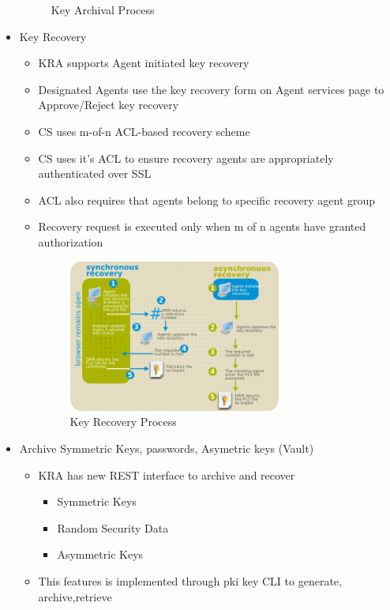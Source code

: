 \documentclass[12pt]{report}
\begin{document}
\begin{itemize}
\begin{figure}[H]
            \caption{Key Archival Process}
        \end{figure}
    \item Key Recovery
        \begin{itemize}
            \item KRA supports Agent initiated key recovery
            \item Designated Agents use the key recovery form on Agent services page
                to Approve/Reject key recovery
            \item CS uses m-of-n ACL-based recovery scheme
            \item CS uses it's ACL to ensure recovery agents are appropriately authenticated
                over SSL
            \item ACL also requires that agents belong to specific recovery agent group
            \item Recovery request is executed only when m of n agents have granted authorization
            \begin{figure}[H]
                \centering
                \includegraphics[width=70mm]{Images/key-recovery.png}
                \caption{Key Recovery Process}
            \end{figure}
        \end{itemize}
    \item Archive Symmetric Keys, passwords, Asymetric keys (Vault)
        \begin{itemize}
            \item KRA has new REST interface to archive and recover 
                \begin{itemize}
                    \item Symmetric Keys
                    \item Random Security Data
                    \item Asymmetric Keys
                \end{itemize}
            \item This features is implemented through pki key CLI to generate, archive,retrieve

\end{itemize}
\end{itemize}
\end{document}
